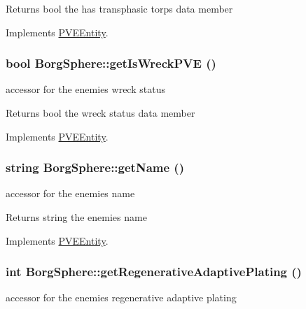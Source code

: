 \begin{DoxyReturn}{Returns}
bool the has transphasic torps data member 
\end{DoxyReturn}


Implements \hyperlink{classPVEEntity}{PVEEntity}.

\hypertarget{classBorgSphere_a325c849451f5f67ba32d07f93a49a0b0}{
\subsubsection[{getIsWreckPVE}]{\setlength{\rightskip}{0pt plus 5cm}bool BorgSphere::getIsWreckPVE ()}}
\label{d6/ddd/classBorgSphere_a325c849451f5f67ba32d07f93a49a0b0}
accessor for the enemies wreck status

\begin{DoxyReturn}{Returns}
bool the wreck status data member 
\end{DoxyReturn}


Implements \hyperlink{classPVEEntity}{PVEEntity}.

\hypertarget{classBorgSphere_a8ff1212f630e7aeb10a6c5249ddd2855}{
\subsubsection[{getName}]{\setlength{\rightskip}{0pt plus 5cm}string BorgSphere::getName ()}}
\label{d6/ddd/classBorgSphere_a8ff1212f630e7aeb10a6c5249ddd2855}
accessor for the enemies name

\begin{DoxyReturn}{Returns}
string the enemies name 
\end{DoxyReturn}


Implements \hyperlink{classPVEEntity}{PVEEntity}.

\hypertarget{classBorgSphere_af697ff58376c915ff2bdebad34762296}{
\subsubsection[{getRegenerativeAdaptivePlating}]{\setlength{\rightskip}{0pt plus 5cm}int BorgSphere::getRegenerativeAdaptivePlating ()}}
\label{d6/ddd/classBorgSphere_af697ff58376c915ff2bdebad34762296}
accessor for the enemies regenerative adaptive plating

